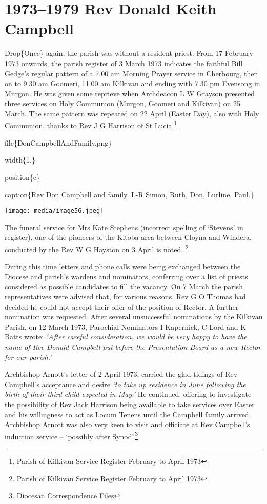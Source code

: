 \hypertarget{rev-donald-keith-campbell}{%
\chapter{1973--1979 Rev Donald Keith Campbell}\label{rev-donald-keith-campbell}}

Drop\{Once\} again, the parish was without a resident priest. From 17 February 1973 onwards, the parish register of 3 March 1973 indicates the faithful Bill Gedge's regular pattern of a 7.00 am Morning Prayer service in Cherbourg, then on to 9.30 am Goomeri, 11.00 am Kilkivan and ending with 7.30 pm Evensong in Murgon. He was given some reprieve when Archdeacon L W Grayson presented three services on Holy Communion (Murgon, Goomeri and Kilkivan) on 25 March. The same pattern was repeated on 22 April (Easter Day), also with Holy Communion, thanks to Rev J G Harrison of St Lucia.\footnote{Parish of Kilkivan Service Register February to April 1973}

file\{DonCampbellAndFamily.png\}

width\{1.\}

position\{c\}

caption\{Rev Don Campbell and family. L-R Simon, Ruth, Don, Lurline, Paul.\}

\texttt{[image: media/image56.jpeg]}

The funeral service for Mrs Kate Stephens (incorrect spelling of `Stevens' in register), one of the pioneers of the Kitoba area between Cloyna and Windera, conducted by the Rev W G Hayston on 3 April is noted. \footnote{Parish of Kilkivan Service Register February to April 1973}

During this time letters and phone calls were being exchanged between the Diocese and parish's wardens and nominators, conferring over a list of priests considered as possible candidates to fill the vacancy. On 7 March the parish representatives were advised that, for various reasons, Rev G O Thomas had decided he could not accept their offer of the position of Rector. A further nomination was requested. After several unsuccessful nominations by the Kilkivan Parish, on 12 March 1973, Parochial Nominators I Kapernick, C Lord and K Batts wrote: \emph{`After careful consideration, we would be very happy to have the name of Rev Donald Campbell put before the Presentation Board as a new Rector for our parish.'}

Archbishop Arnott's letter of 2 April 1973, carried the glad tidings of Rev Campbell's acceptance and desire \emph{`to take up residence in June following the birth of their third child expected in May.'} He continued, offering to investigate the possibility of Rev Jack Harrison being available to take services over Easter and his willingness to act as Locum Tenens until the Campbell family arrived. Archbishop Arnott was also very keen to visit and officiate at Rev Campbell's induction service -- `possibly after Synod'.\footnote{Diocesan Correspondence Files}

